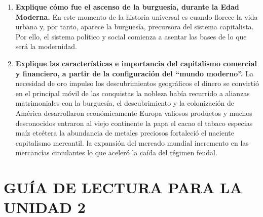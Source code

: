 \documentclass[12pt]{book}
\begin{document}
\begin{enumerate}
\item \textbf{ Explique cómo fue el ascenso de la burguesía, durante la Edad Moderna.}
En este momento de la historia universal es cuando florece la vida urbana
y, por tanto, aparece la burguesía, precursora del sistema capitalista.
Por ello, el sistema político y social comienza a asentar las bases de lo que
será la modernidad.
 


\item \textbf{ Explique las características e importancia del capitalismo comercial y financiero, a
partir de la configuración del “mundo moderno”.}
La necesidad de oro  impulso los descubrimientos geográficos el dinero se convirtió en el principal móvil de las conquistas la nobleza había recurrido a alianzas matrimoniales con la burguesía,  el descubrimiento y la colonización de América desarrollaron económicamente Europa valiosos productos y muchos desconocidos entraron al viejo continente la papa el cacao el tabaco especias maíz etcétera la abundancia de metales preciosos fortaleció el naciente capitalismo mercantil.
la expansión del mercado mundial incremento en las mercancías circulantes lo que aceleró la caída del régimen feudal.

\end{enumerate}



\chapter{GUÍA DE LECTURA PARA LA UNIDAD 2}
\end{document}
